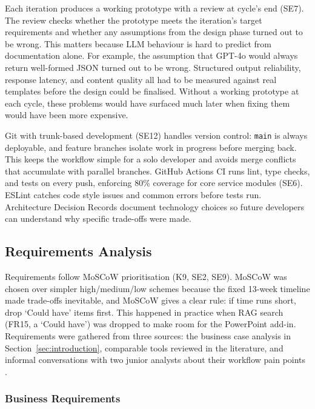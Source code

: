 Each iteration produces a working prototype with a review at cycle's end (SE7). The review checks whether the prototype meets the iteration's target requirements and whether any assumptions from the design phase turned out to be wrong. This matters because LLM behaviour is hard to predict from documentation alone. For example, the assumption that GPT-4o would always return well-formed JSON turned out to be wrong. Structured output reliability, response latency, and content quality all had to be measured against real templates before the design could be finalised. Without a working prototype at each cycle, these problems would have surfaced much later when fixing them would have been more expensive.

Git with trunk-based development (SE12) handles version control: \texttt{main} is always deployable, and feature branches isolate work in progress before merging back. This keeps the workflow simple for a solo developer and avoids merge conflicts that accumulate with parallel branches. GitHub Actions CI runs lint, type checks, and tests on every push, enforcing 80\% coverage for core service modules \parencite{fowler2006} (SE6). ESLint \parencite{eslint2024} catches code style issues and common errors before tests run. Architecture Decision Records \parencite{tyree2005} document technology choices so future developers can understand why specific trade-offs were made.

\subsection{Requirements Analysis}

Requirements follow MoSCoW prioritisation \parencite{clegg1994} (K9, SE2, SE9). MoSCoW was chosen over simpler high/medium/low schemes because the fixed 13-week timeline made trade-offs inevitable, and MoSCoW gives a clear rule: if time runs short, drop `Could have' items first. This happened in practice when RAG search (FR15, a `Could have') was dropped to make room for the PowerPoint add-in. Requirements were gathered from three sources: the business case analysis in Section~\ref{sec:introduction}, comparable tools reviewed in the literature, and informal conversations with two junior analysts about their workflow pain points \parencite{robertson2012}.

\subsubsection{Business Requirements}

